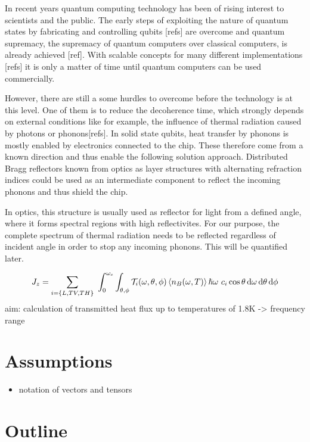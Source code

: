 In recent years quantum computing technology has been of rising
interest to scientists and the public. The early steps of exploiting the nature
of quantum states by fabricating and controlling qubits [refs] are
overcome and quantum supremacy, the supremacy of quantum computers over
classical computers, is already achieved [ref]. With scalable concepts for many
different implementations [refs] it is only a matter of time until quantum
computers can be used commercially.

However, there are still a some hurdles to overcome before the technology is at
this level. One of them is to reduce the decoherence time, which strongly
depends on external conditions like for example, the influence of thermal
radiation caused by photons or phonons[refs]. In solid state qubits, heat
transfer by
phonons is mostly enabled by electronics connected to the chip. These therefore
come from a known direction and thus enable the following solution approach.
Distributed Bragg reflectors known from optics as layer structures with
alternating refraction indices could be used as an intermediate component to
reflect the incoming phonons and thus shield the chip.

In optics, this structure is usually used as reflector for light from a
defined angle, where it forms spectral regions with high reflectivites. For our
purpose, the complete spectrum of thermal radiation needs to be reflected
regardless of incident angle in order to stop any incoming phonons. This will
be quantified later.

\begin{equation} \label{eq:totalheatflow}
    J_z = \sum\limits_{i=\{L,TV,TH\}}\ \int_0^{\omega_c}\int_{\theta, \phi}
    \mathcal{T}_i(\omega, \theta, \phi) \expval{n_B(\omega, T)} \hslash \omega\ 
    c_i\cos \theta \dd{\omega} \dd{\theta}\dd{\phi}
\end{equation}
aim: calculation of transmitted heat flux up to temperatures of 1.8K
-> frequency range

\section{Assumptions}
\begin{itemize}
    \item notation of vectors and tensors
\end{itemize}

\section{Outline}